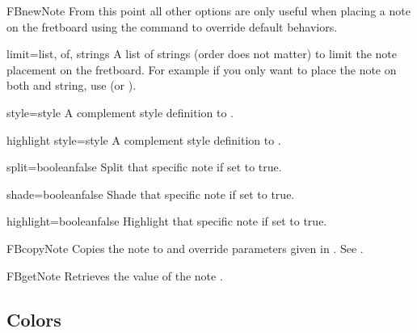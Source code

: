 \documentclass[a4paper]{article}
\begin{document}
\begin{docCommand}{FBnewNote}{}
  From this point all other options are only useful when placing a note on
  the fretboard using the  command to override default
  behaviors.

  \begin{docKey}{limit}{={list, of, strings}}{}
    A list of strings (order does not matter) to limit the note placement on
    the fretboard. For example if you only want to place the note on both
     and  string, use  (or ).
  \end{docKey}

  \begin{docKey}{style}{={style}}{}
    A complement style definition to .
  \end{docKey}

  \begin{docKey}{highlight style}{={style}}{}
    A complement style definition to .
  \end{docKey}

  \begin{docKey}{split}{={boolean}}{false}
    Split that specific note if set to true.
  \end{docKey}

  \begin{docKey}{shade}{={boolean}}{false}
    Shade that specific note if set to true.
  \end{docKey}

  \begin{docKey}{highlight}{={boolean}}{false}
    Highlight that specific note if set to true.
  \end{docKey}

\end{docCommand}

\begin{docCommand}{FBcopyNote}{}
  Copies the note  to  and override parameters given in
  . See .
\end{docCommand}

\begin{docCommand}{FBgetNote}{}
  Retrieves the  value of the note .
\end{docCommand}


\subsection{Colors}
\end{document}
